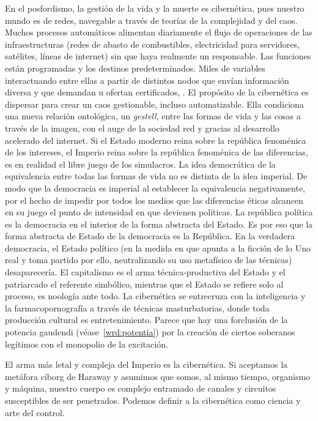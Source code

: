 En el posfordismo, la gestión de la vida y la muerte es cibernética, pues nuestro mundo es de redes, navegable a través de teorías de la complejidad y del caos. Muchos procesos automáticos alimentan diariamente el flujo de operaciones de las infraestructuras (redes de abasto de combustibles, electricidad para servidores, satélites, líneas de internet) sin que haya realmente un responsable. Las funciones están programadas y los destinos predeterminados. Miles de variables interactuando entre ellas a partir de distintos nodos que envían información diversa y que demandan u ofertan certificados, . El propósito de la cibernética es dispersar para crear un caos gestionable, incluso automatizable. Ella condiciona una nueva relación ontológica, un \emph{gestell}, entre las formas de vida y las cosas a través de la imagen, con el auge de la sociedad red y gracias al desarrollo acelerado del internet. Si el Estado moderno reina sobre la república fenoménica de los intereses, el Imperio reina sobre la república fenoménica de las diferencias, es en realidad el libre juego de los simulacros. La idea democrática de la equivalencia entre todas las formas de vida no es distinta de la idea imperial. De modo que la democracia es imperial al establecer la equivalencia negativamente, por el hecho de impedir por todos los medios que las diferencias éticas alcancen en su juego el punto de intensidad en que devienen políticas. La república política es la democracia en el interior de la forma abstracta del Estado. Es por eso que la forma abstracta de Estado de la democracia es la República. En la verdadera democracia, el Estado político (en la medida en que apunta a la ficción de lo Uno real y toma partido por ello, neutralizando su uso metafísico de las técnicas) desaparecería. El capitalismo es el arma técnica-productiva del Estado y el patriarcado el referente simbólico, mientras que el Estado se refiere solo al proceso, es noología ante todo. La cibernética se entrecruza con la inteligencia y la farmacopornografía a través de técnicas masturbatorias, donde toda producción cultural es entretenimiento. Parece que hay una forclusión de la potencia gaudendi (véase~\ref{wrd:potentia}) por la creación de ciertos soberanos legítimos con el monopolio de la excitación.

El arma más letal y compleja del Imperio es la cibernética. Si aceptamos la metáfora ciborg de Haraway y asumimos que somos, al mismo tiempo, organismo y máquina, nuestro cuerpo es complejo entramado de canales y circuitos susceptibles de ser penetrados. Podemos definir a la cibernética como ciencia y arte del control.

